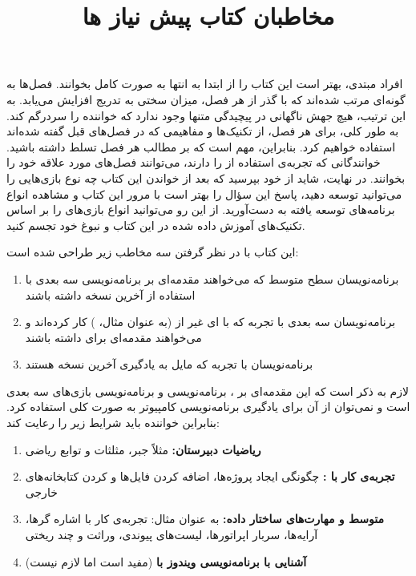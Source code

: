 {
    \Large
    \begin{spacing}{1.5}
        افراد مبتدی، بهتر است این کتاب را از ابتدا به انتها به صورت کامل بخوانند. فصل‌ها به گونه‌ای مرتب شده‌اند که با گذر از هر فصل، میزان سختی به تدریج افزایش می‌یابد. به این ترتیب، هیچ جهش ناگهانی در پیچیدگی متنها وجود ندارد که خواننده را سردرگم کند.
        به طور کلی، برای هر فصل، از تکنیک‌ها و مفاهیمی که در فصل‌های قبل گفته شده‌اند استفاده خواهیم کرد. بنابراین، مهم است که بر مطالب هر فصل تسلط داشته باشید.
        خوانندگانی که تجربه‌ی استفاده از  را دارند، می‌توانند فصل‌های مورد علاقه خود را بخوانند. در نهایت، شاید از خود بپرسید که بعد از خواندن این کتاب چه نوع بازی‌هایی را می‌توانید توسعه دهید، پاسخ این سؤال را بهتر است با مرور این کتاب و مشاهده انواع برنامه‌های توسعه یافته به دست‌آورید.
        از این رو می‌توانید انواع بازی‌های را بر اساس تکنیک‌های آموزش داده شده در این کتاب و نبوغ خود تجسم کنید.
    \end{spacing}
}

\newpage

\title{
    \LARGE
    \textbf{مخاطبان کتاب}
}\rullFillWithLine[0.5em]{1pt}
\textbf{\vspace{12pt}}

{
    \Large
    این کتاب با در نظر گرفتن سه مخاطب زیر طراحی شده است:
    \begin{enumerate}
        \item {برنامه‌نویسان سطح متوسط  که می‌خواهند مقدمه‌ای بر برنامه‌نویسی سه بعدی با استفاده از آخرین نسخه  داشته باشند}
        \item {برنامه‌نویسان سه بعدی با تجربه که با ‌ای غیر از  (به عنوان مثال، ) کار کرده‌اند و می‌خواهند مقدمه‌ای برای  داشته باشند}
        \item {برنامه‌نویسان با تجربه  که مایل به یادگیری آخرین نسخه  هستند}
    \end{enumerate}
}
\textbf{\vspace{25pt}}

\title{
    \LARGE
    \textbf{پیش نیاز ها}
} \rullFillWithLine[0.5em]{1pt}
\textbf{\vspace{12pt}}

{
    \Large
    لازم به ذکر است که این مقدمه‌ای بر ، برنامه‌نویسی  و برنامه‌نویسی بازی‌های سه بعدی است و نمی‌توان از آن برای یادگیری برنامه‌نویسی کامپیوتر به صورت کلی استفاده کرد. بنابراین خواننده باید شرایط زیر را رعایت کند:
    \begin{enumerate}
        \item {\textbf{ریاضیات دبیرستان: } مثلاً جبر، مثلثات و توابع ریاضی}
        \item {\textbf{تجربه‌ی کار با :} چگونگی ایجاد پروژه‌ها، اضافه کردن فایل‌ها و  کردن کتابخانه‌های خارجی}
        \item {\textbf{ متوسط و مهارت‌های ساختار داده:} به عنوان مثال: تجربه‌ی کار با اشاره گر‌ها، آرایه‌ها، سربار اپراتور‌ها، لیست‌های پیوندی، وراثت و چند ریختی}
        \item {\textbf{آشنایی با برنامه‌نویسی ویندوز با } (مفید است اما لازم نیست)}
    \end{enumerate}
}
\newpage


